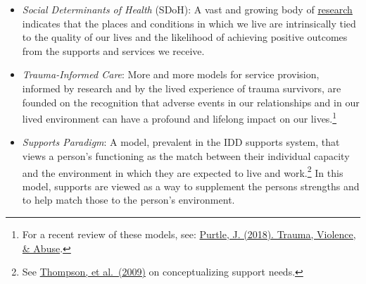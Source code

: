 \documentclass[
]{book}
\providecommand{\tightlist}{%
  \setlength{\itemsep}{0pt}\setlength{\parskip}{0pt}}
\begin{document}
\begin{itemize}
\tightlist
\item
  \emph{Social Determinants of Health} (SDoH): A vast and growing body of \href{https://www.cdc.gov/socialdeterminants/research/index.htm}{research} indicates that the places and conditions in which we live are intrinsically tied to the quality of our lives and the likelihood of achieving positive outcomes from the supports and services we receive.
\item
  \emph{Trauma-Informed Care}: More and more models for service provision, informed by research and by the lived experience of trauma survivors, are founded on the recognition that adverse events in our relationships and in our lived environment can have a profound and lifelong impact on our lives.\footnote{For a recent review of these models, see: \href{https://www.ncbi.nlm.nih.gov/pubmed/30079827}{Purtle, J. (2018). Trauma, Violence, \& Abuse}.}
\item
  \emph{Supports Paradigm}: A model, prevalent in the IDD supports system, that views a person's functioning as the match between their individual capacity and the environment in which they are expected to live and work.\footnote{See \href{https://www.ncbi.nlm.nih.gov/pubmed/19368481}{Thompson, et al.~(2009)} on conceptualizing support needs.} In this model, supports are viewed as a way to supplement the persons strengths and to help match those to the person's environment.
\end{itemize}

  
\end{document}
